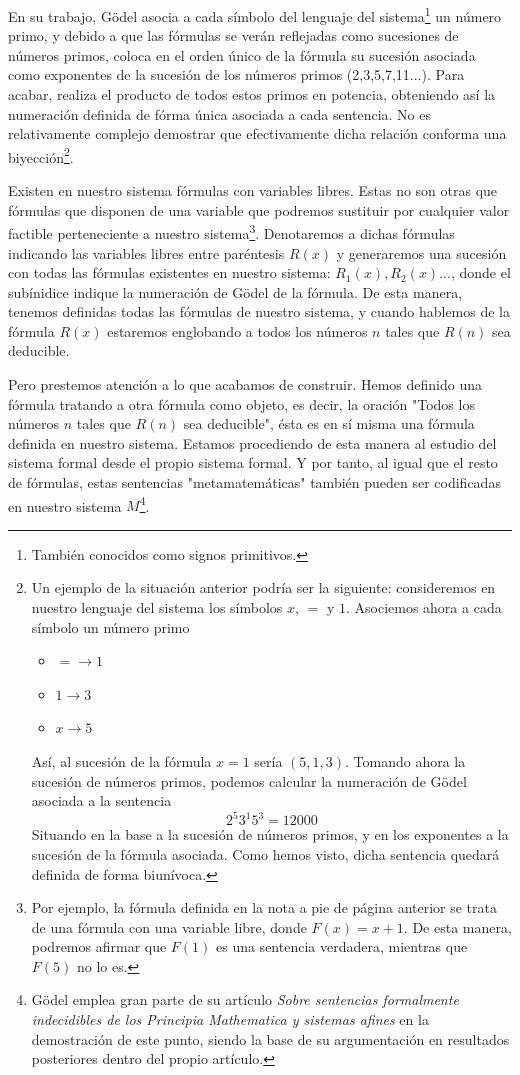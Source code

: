 En su trabajo, Gödel asocia a cada símbolo del lenguaje del sistema\footnote{También conocidos como signos primitivos.} un número primo, y debido a que las fórmulas se verán reflejadas como sucesiones de números primos, coloca en el orden único de la fórmula 
su sucesión asociada como exponentes de la sucesión de los números primos (2,3,5,7,11...). Para acabar, realiza el producto de todos estos primos en potencia, obteniendo así la numeración definida de fórma única asociada a cada sentencia. No es relativamente 
complejo demostrar que efectivamente dicha relación conforma una biyección\footnote{Un ejemplo de la situación anterior podría ser la siguiente: consideremos en nuestro lenguaje del sistema los símbolos $x$, $=$ y $1$. Asociemos ahora a cada símbolo un número primo
\begin{itemize}
    \item $= \rightarrow 1$
    \item $1 \rightarrow 3$
    \item $x \rightarrow 5$
\end{itemize}
Así, al sucesión de la fórmula $x = 1$ sería $(5,1,3)$. Tomando ahora la sucesión de números primos, podemos calcular la numeración de Gödel asociada a la sentencia 
$$2^5 3^1 5^3 = 12000$$
Situando en la base a la sucesión de números primos, y en los exponentes a la sucesión de la fórmula asociada. Como hemos visto, dicha sentencia quedará definida de forma biunívoca.}.

Existen en nuestro sistema fórmulas con variables libres. Estas no son otras que fórmulas que disponen de una variable que podremos sustituir por cualquier valor factible perteneciente a nuestro sistema\footnote{Por ejemplo, la fórmula definida en la nota a pie de página 
anterior se trata de una fórmula con una variable libre, donde $F(x) = x+1$. De esta manera, podremos afirmar que $F(1)$ es una sentencia verdadera, mientras que $F(5)$ no lo es.}. Denotaremos a dichas fórmulas indicando las variables libres entre 
paréntesis $R(x)$ y generaremos una sucesión con todas las fórmulas existentes en nuestro sistema: $R_1(x), R_2(x)...$, donde el subínidice indique la numeración de Gödel de la fórmula. De esta manera, tenemos definidas todas las fórmulas de nuestro sistema, y 
cuando hablemos de la fórmula $R(x)$ estaremos englobando a todos los números $n$ tales que $R(n)$ sea deducible.

Pero prestemos atención a lo que acabamos de construir. Hemos definido una fórmula tratando a otra fórmula como objeto, es decir, la oración "Todos los números $n$ tales que $R(n)$ sea deducible", ésta es en sí misma una fórmula definida en nuestro sistema. 
Estamos procediendo de esta manera al estudio del sistema formal desde el propio sistema formal. Y por tanto, al igual que el resto de fórmulas, estas sentencias "metamatemáticas" también pueden ser codificadas en nuestro sistema $M$\footnote{Gödel emplea gran parte 
de su artículo \textit{Sobre sentencias formalmente indecidibles de los Principia Mathematica y sistemas afines} en la demostración de este punto, siendo la base de su argumentación en resultados posteriores dentro del propio artículo.}.

